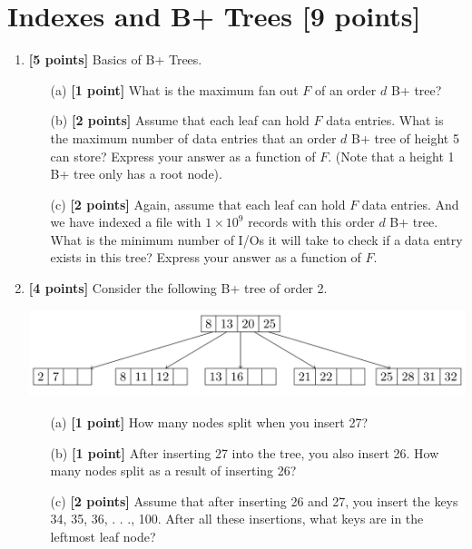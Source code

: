 \documentclass[10pt]{article}
\begin{document}
\newpage
\section{Indexes and B+ Trees \textbf{[9 points]}}

\begin{enumerate}

	\item \textbf{[5 points]} Basics of B+ Trees.
	      \begin{itemize}
		      \item[(a)] \textbf{[1 point]} What is the maximum fan out $F$ of an order $d$ B+ tree? %

		      \item[(b)] \textbf{[2 points]}
		            Assume that each leaf can hold $F$ data entries. What is the maximum number of data entries
		            that an order $d$ B+ tree of height 5 can store? Express your answer as a function of $F$. (Note that a height 1 B+ tree only has a root node).

		      \item[(c)] \textbf{[2 points]}
		            Again, assume that each leaf can hold $F$ data entries. And we have indexed a file with $1\times 10^9$ records with this
		            order $d$ B+ tree. What is the minimum number of I/Os it will take to check if a data entry exists in this tree?
		            Express your answer as a function of $F$.
	      \end{itemize}

	\item \textbf{[4 points]}
	      Consider the following B+ tree of order 2.
	      \begin{center}
		      \includegraphics[scale=0.25]{Btree.png}
	      \end{center}
	      \begin{itemize}
		      \item[(a)] \textbf{[1 point]} How many nodes split when you insert 27?

		      \item[(b)] \textbf{[1 point]} After inserting 27 into the tree, you also insert 26. How many nodes split as a result of inserting
		            26?

		      \item[(c)] \textbf{[2 points]} Assume that after inserting 26 and 27, you insert the keys 34, 35, 36, . . ., 100. After all these
		            insertions, what keys are in the leftmost leaf node?
	      \end{itemize}
\end{enumerate}
\end{document}
